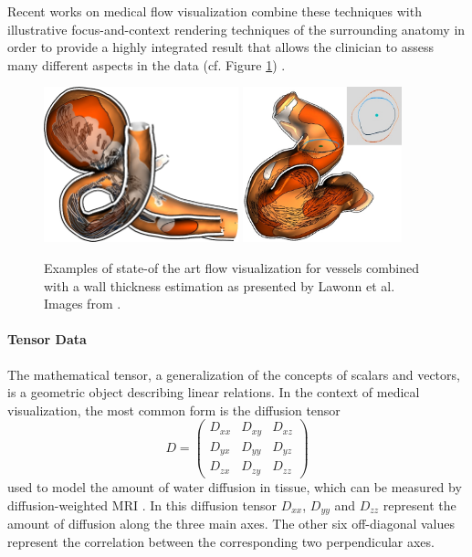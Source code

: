 Recent works on medical flow visualization combine these techniques with illustrative focus-and-context rendering techniques of the surrounding anatomy in order to provide a highly integrated result that allows the clinician to assess many different aspects in the data (cf. Figure \ref{fig:background:lawonn-flow}) \cite{VanPelt:2010:StylisticFlowVis, Gasteiger:2011:FlowLens, Lawonn:2016:BloodFlowWallThickness}.
\begin{figure}[ht]
	\centering
	\includegraphics[height=4.5cm]{figures/background/lawonn-flow2.jpg}
	\quad
	\includegraphics[height=4.5cm]{figures/background/lawonn-flow1.jpg}
	\caption{
		Examples of state-of the art flow visualization for vessels combined with a wall thickness estimation as presented by Lawonn et al. Images from \cite{Lawonn:2016:BloodFlowWallThickness}.
	}
	\label{fig:background:lawonn-flow}
\end{figure}

\paragraph{Tensor Data}
The mathematical tensor, a generalization of the concepts of scalars and vectors, is a geometric object describing linear relations.
In the context of medical visualization, the most common form is the diffusion tensor 
\begin{equation}
	D = \begin{pmatrix}
			D_{xx}	&	D_{xy}	& D_{xz} \\
			D_{yx}	&	D_{yy}	& D_{yz} \\
			D_{zx}	&	D_{zy}	& D_{zz}
		\end{pmatrix}
\end{equation}
used to model the amount of water diffusion in tissue, which can be measured by diffusion-weighted MRI \cite{Cercignani:2001:DWMRI, Westin:2002:DTMRI}.
In this diffusion tensor $D_{xx}$, $D_{yy}$ and $D_{zz}$ represent the amount of diffusion along the three main axes.
The other six off-diagonal values represent the correlation between the corresponding two perpendicular axes.


